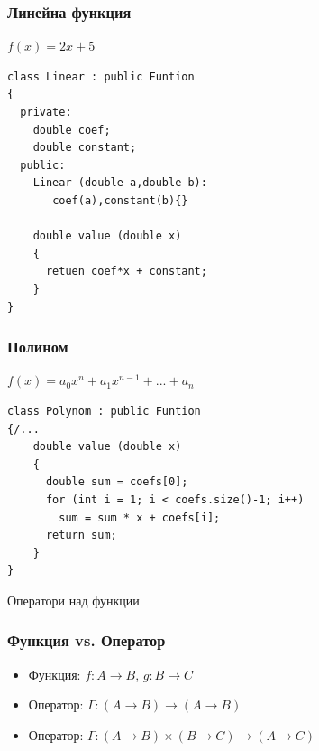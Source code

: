 \documentclass{beamer}
\begin{document}
\begin{frame}[fragile]
\frametitle{Линейна функция}

\begin{center}

$f(x) = 2x + 5$

\begin{lstlisting}
class Linear : public Funtion
{
  private:
    double coef;
    double constant;
  public:
    Linear (double a,double b):
       coef(a),constant(b){}

    double value (double x)
    {
      retuen coef*x + constant;
    }
}
\end{lstlisting}
  
\end{center}


\end{frame}



\begin{frame}[fragile]
\frametitle{Полином}

\begin{center}

$f(x) = a_0x^n + a_1x^{n-1}+...+a_n$

\begin{lstlisting}
class Polynom : public Funtion
{/...
    double value (double x)
    {
      double sum = coefs[0];
      for (int i = 1; i < coefs.size()-1; i++)
        sum = sum * x + coefs[i];
      return sum;
    }
}
\end{lstlisting}
  
\end{center}


\end{frame}




\begin{frame}
\centerline{Оператори над функции}
\end{frame}


\begin{frame}[fragile]
\frametitle{Функция vs. Оператор}

\begin{itemize}
  \item Функция: $f:A\rightarrow B$, $g:B\rightarrow C$
  \item Оператор: $\Gamma:(A\rightarrow B)\rightarrow (A\rightarrow B)$ 
  \item Оператор: $\Gamma:(A\rightarrow B)\times(B\rightarrow C)\rightarrow (A\rightarrow C)$ 
\end{itemize}

\end{frame}
\end{document}
